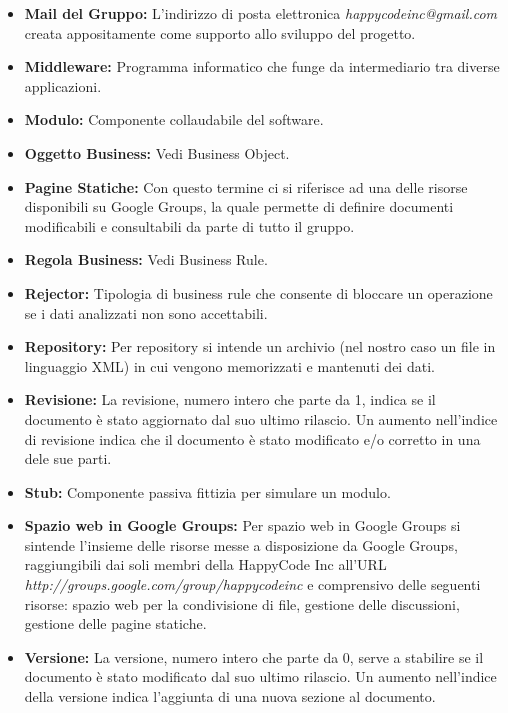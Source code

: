 \documentclass[11pt,titlepage,a4paper]{report}
\begin{document}
\begin{itemize}
\item{\textbf{Mail del Gruppo:}
L'indirizzo di posta elettronica \textit{happycodeinc@gmail.com} creata appositamente come supporto allo sviluppo del progetto.}

\item{\textbf{Middleware:}
Programma informatico che funge da intermediario tra diverse applicazioni.}

\item{\textbf{Modulo:}
Componente collaudabile del software.}

\item{\textbf{Oggetto Business:}
Vedi Business Object.}

\item{\textbf{Pagine Statiche:}
Con questo termine ci si riferisce ad una delle risorse disponibili su Google Groups,  la quale permette di definire documenti modificabili e consultabili da parte di tutto il gruppo.}

\item{\textbf{Regola Business:}
Vedi Business Rule.}

\item{\textbf{Rejector:}
Tipologia di business rule che consente di bloccare un operazione se i dati analizzati non sono accettabili.}
 
\item{\textbf{Repository:}
Per repository si intende un archivio (nel nostro caso un file in linguaggio XML) in cui vengono memorizzati e mantenuti dei dati.}

\item{\textbf{Revisione:}
La revisione, numero intero che parte da 1, indica se il documento \`e stato aggiornato dal suo ultimo rilascio. Un aumento nell'indice di revisione indica che il documento \`e stato modificato e/o corretto in una dele sue parti}.

\item{\textbf{Stub:}
Componente passiva fittizia per simulare un modulo.}

\item{\textbf{Spazio web in Google Groups:}
Per spazio web in Google Groups si sintende l'insieme delle risorse messe a disposizione da Google Groups, raggiungibili dai soli membri della HappyCode Inc all'URL\\ \textit{http://groups.google.com/group/happycodeinc} e comprensivo delle seguenti risorse: spazio web per la condivisione di file, gestione delle discussioni, gestione delle pagine statiche.}

\item{\textbf{Versione:}
La versione, numero intero che parte da 0, serve a stabilire se il documento \`e stato modificato dal suo ultimo rilascio. Un aumento nell'indice della versione indica l'aggiunta di  una nuova sezione al documento.}

\end{itemize}

\newpage
\tableofcontents
\end{document}
